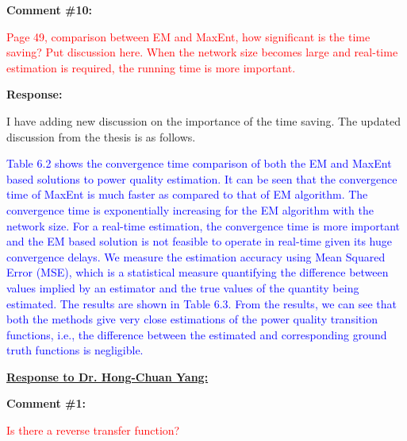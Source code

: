 \documentclass[journal]{IEEEtran}
\begin{document}
\vspace{20pt}
\textbf{Comment \#10:}
\begin{adjustwidth}{2.5em}{0pt}
\singlespacing \vspace{-10pt}
\textcolor{red}{Page 49, comparison between EM and MaxEnt, how significant is the time saving? Put discussion here. When the network size becomes large and real-time estimation is required, the running time is more important.}
\end{adjustwidth}

\vspace{10pt}
\textbf{Response:}
\begin{adjustwidth}{2.5em}{0pt}
I have adding new discussion on the importance of the time saving. The updated discussion from the thesis is as follows.

\vspace{10pt}
\noindent\textcolor{blue}{Table 6.2 shows the convergence time comparison of both the EM and MaxEnt based solutions to power quality estimation. It can be seen that the convergence time of MaxEnt is much faster as compared to that of EM algorithm. The convergence time is exponentially increasing for the EM algorithm with the network size. For a real-time estimation, the convergence time is more important and the EM based solution is not feasible to operate in real-time given its huge convergence delays. We measure the estimation accuracy using Mean Squared Error (MSE), which is a statistical measure quantifying the difference between values implied by an estimator and the true values of the quantity being estimated. The results are shown in Table 6.3. From the results, we can see that both the methods give very close estimations of the power quality transition functions, i.e., the difference between the estimated and corresponding ground truth functions is negligible.}
\end{adjustwidth}






\vspace{50pt}
 \Large
\noindent \textbf{\underline{Response to Dr. Hong-Chuan Yang:}}
 \large
 
 \vspace{10pt}
\textbf{Comment \#1:}
\begin{adjustwidth}{2.5em}{0pt}
\singlespacing \vspace{-10pt}
\textcolor{red}{Is there a reverse transfer function?}
\end{adjustwidth}
\end{document}
